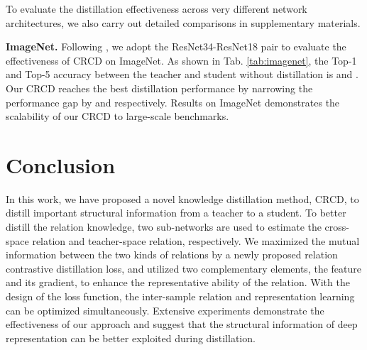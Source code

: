 \documentclass[final]{cvpr}
\begin{document}
To evaluate the distillation effectiveness across very different network architectures, we also
carry out detailed comparisons in supplementary materials.

\noindent \textbf{ImageNet.}
Following \cite{crd,SSKD}, we adopt the ResNet34-ResNet18 pair to evaluate the effectiveness of CRCD on ImageNet.
As shown in Tab. \ref{tab:imagenet},  the Top-1 and Top-5 accuracy between the teacher and student without  distillation  is  and . Our CRCD reaches the best distillation  performance by narrowing the performance gap by  and  respectively.
Results on ImageNet demonstrates the scalability of our CRCD to large-scale benchmarks.



\section{Conclusion}
\vspace{-0.6em}
In this work, we have proposed a novel knowledge distillation method, CRCD,  to distill important structural information from a teacher to a student. To better distill the relation knowledge, two sub-networks are used to estimate the cross-space relation and teacher-space relation, respectively. We maximized the mutual information between the two kinds of relations by a newly proposed relation contrastive distillation loss, and utilized two complementary elements, the feature and its gradient, to enhance the representative ability of the relation. With the design of the loss function, the inter-sample relation and representation learning can be optimized simultaneously. Extensive experiments demonstrate the effectiveness of our approach and suggest that the  structural information of deep representation can be better exploited during distillation.

{\small


}
\end{document}
